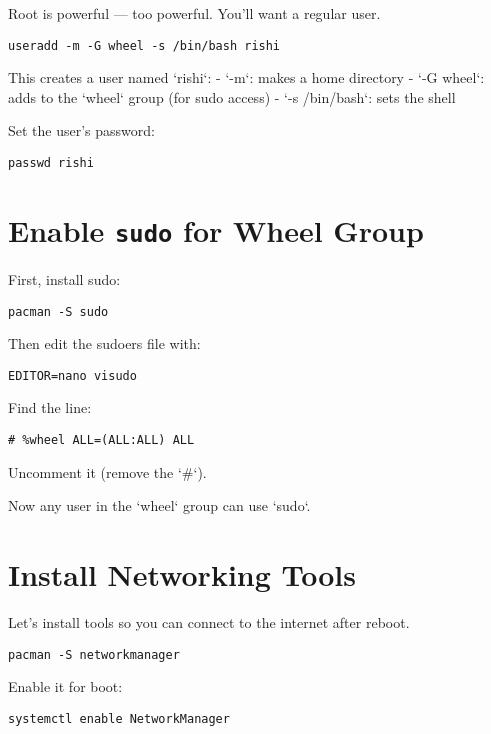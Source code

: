 \documentclass[12pt,openany]{book}
\begin{document}
Root is powerful — too powerful. You’ll want a regular user.

\begin{lstlisting}
useradd -m -G wheel -s /bin/bash rishi
\end{lstlisting}

This creates a user named `rishi`:
- `-m`: makes a home directory
- `-G wheel`: adds to the `wheel` group (for sudo access)
- `-s /bin/bash`: sets the shell

Set the user’s password:

\begin{lstlisting}
passwd rishi
\end{lstlisting}

\section{Enable \texttt{sudo} for Wheel Group}

First, install sudo:

\begin{lstlisting}
pacman -S sudo
\end{lstlisting}

Then edit the sudoers file with:

\begin{lstlisting}
EDITOR=nano visudo
\end{lstlisting}

Find the line:

\begin{lstlisting}
# %wheel ALL=(ALL:ALL) ALL
\end{lstlisting}

Uncomment it (remove the `#`).

Now any user in the `wheel` group can use `sudo`.

\section{Install Networking Tools}

Let’s install tools so you can connect to the internet after reboot.

\begin{lstlisting}
pacman -S networkmanager
\end{lstlisting}

Enable it for boot:

\begin{lstlisting}
systemctl enable NetworkManager
\end{lstlisting}
\end{document}

